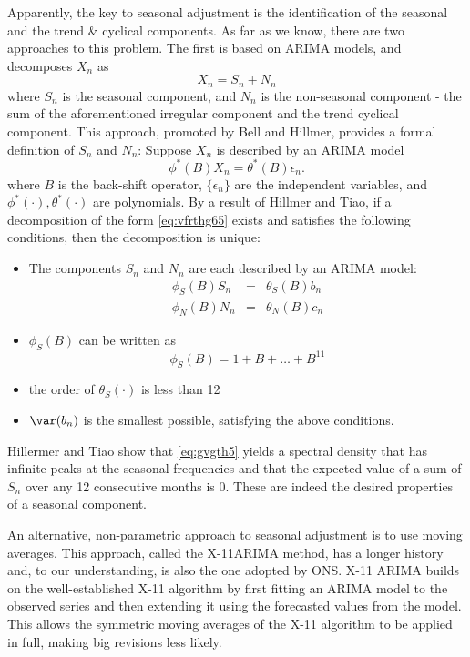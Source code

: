 \documentclass[a4paper,11pt,pdftex,twoside,titlepage]{article}
\begin{document}
Apparently, the key to seasonal adjustment is the identification of
the seasonal and the trend \& cyclical components. As far as we know,
there are two approaches to this problem. The first is based on ARIMA
models, and decomposes $X_n$ as
\begin{equation}
  \label{eq:vfrthg65}
  X_n = S_n + N_n  
\end{equation}
where $S_n$ is the seasonal component, and $N_n$ is the non-seasonal
component - the sum of the aforementioned irregular component and the
trend cyclical component. This approach, promoted by Bell and Hillmer,
provides a formal definition of $S_n$ and $N_n$: Suppose $X_n$ is
described by an ARIMA model
\begin{equation}
  \label{eq:vtr65}
  \phi^* (B) X_n = \theta^* (B) \epsilon_n.  
\end{equation}
where $B$ is the back-shift operator, $\{\epsilon_n\}$ are the
independent variables, and $\phi^*(\cdot), \theta^*(\cdot)$ are
polynomials. By a result of Hillmer and Tiao, if a decomposition of
the form \eqref{eq:vfrthg65} exists and satisfies the following
conditions, then the decomposition is unique:
\begin{itemize}
\item The components $S_n$ and $N_n$ are each described by an ARIMA model:
  \begin{eqnarray*}
    \phi_S(B) S_n &=& \theta_S(B) b_n \\
    \phi_N(B) N_n &=& \theta_N(B) c_n
  \end{eqnarray*}
\item $\phi_S(B)$ can be written as
  \begin{equation}
    \label{eq:gvgth5}
    \phi_S(B) = 1 + B + \dots + B^{11}  
  \end{equation}
\item the order of $\theta_S(\cdot)$ is less than 12
\item $\var(b_n)$ is the smallest possible, satisfying the above conditions.
\end{itemize}
Hillermer and Tiao show that \eqref{eq:gvgth5} yields a spectral
density that has infinite peaks at the seasonal frequencies and that 
the expected value of a sum of $S_n$ over any 12 consecutive months is
0. These are indeed the desired properties of a seasonal component.

An alternative, non-parametric approach to seasonal adjustment is to
use moving averages. This approach, called the X-11ARIMA method, has a
longer history and, to our understanding, is also the one adopted by
ONS. X-11 ARIMA builds on the well-established X-11 algorithm by first
fitting an ARIMA model to the observed series and then extending it
using the forecasted values from the model. This allows the symmetric
moving averages of the X-11 algorithm to be applied in full, making
big revisions less likely.
\end{document}
